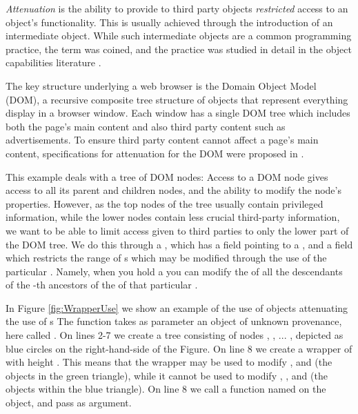 \emph{Attenuation} is the ability to provide to third party objects \emph{restricted}  access to an object's functionality. This is usually achieved through the introduction of an intermediate object. While such intermediate objects are a common programming practice, 
the term was coined, and the practice  was studied in detail in the object capabilities literature \cite{MillerPhD}. 

The key structure underlying a web browser is the Domain Object Model
(DOM), a recursive composite tree structure of objects that represent
everything display in a browser window.  Each window has a single DOM
tree which includes both the page's main content and also third party
content such as advertisements. To ensure third party content cannot
affect a page's main content,
specifications for attenuation for the DOM were proposed in \cite{dd}. 

This example deals with a tree of DOM nodes: Access to a DOM node
gives access to all its parent and children nodes, and the ability to
modify the node's properties. However, as the top nodes of the tree
usually contain privileged information, while the lower nodes contain
less crucial third-party information, we want to be able to limit  access given to third parties to only the lower part of the DOM tree. We do this through a , which has a field  pointing to a , and a field  which restricts the range of s which may be modified through the use of the particular . Namely, when you hold a   you can modify the  of all the descendants of the    -th ancestors of the  of that particular . %


In Figure \ref{fig:WrapperUse} we show an example of the use of   objects attenuating the use of s  The function  takes as parameter an object of unknown provenance, here called . On lines 2-7 we create  a tree consisting of nodes , , ... , depicted as blue circles on the   right-hand-side of the Figure. On line 8 we create a wrapper of  with height . This means that the wrapper  may be used to modify ,  and  (\ie the objects in the green triangle), while it cannot be used to modify , , and  (\ie the objects within the blue triangle). 
On line 8 we call a  function named  on the  object, and pass  as   argument. 

